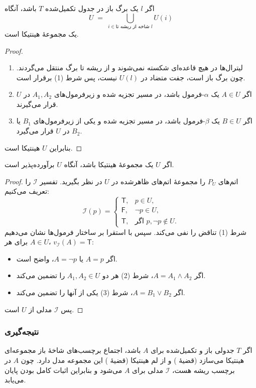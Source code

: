   \begin{theorem}[قضیهٔ \lr{2.77}]
  اگر \(l\) یک برگ باز در جدول تکمیل‌شده \(T\) باشد، آنگاه
  \[
    U \;=\;\bigcup_{i\in\text{شاخه از ریشه تا }l} U(i)
  \]
  یک مجموعهٔ هینتیکا است.
  \end{theorem}
  \begin{proof}
  \begin{enumerate}[1)]
    \item لیترال‌ها در هیچ قاعده‌ای شکسته نمی‌شوند و از ریشه تا برگ منتقل می‌گردند. چون برگ باز است، جفت متضاد در \(U(l)\) نیست، پس شرط (1) برقرار است.
    \item اگر \(A\in U\) یک \(\alpha\)-فرمول باشد، در مسیر تجزیه شده و زیرفرمول‌های \(A_1,A_2\) در \(U\) قرار می‌گیرند.
    \item اگر \(B\in U\) یک \(\beta\)-فرمول باشد، در مسیر تجزیه شده و یکی از زیرفرمول‌های \(B_1\) یا \(B_2\) در \(U\) قرار می‌گیرد.
  \end{enumerate}
  بنابراین \(U\) هینتیکا است.
  \end{proof}
  
  \begin{theorem}[لم هینتیکا \lr{2.78}]
  اگر \(U\) یک مجموعهٔ هینتیکا باشد، آنگاه \(U\) برآورده‌پذیر است.
  \end{theorem}
  \begin{proof}
  اتم‌های \(P_U\) را مجموعهٔ اتم‌های ظاهرشده در \(U\) در نظر بگیرید. تفسیر
  \(\mathscr{I}\) را تعریف می‌کنیم:
  \[
  \mathscr{I}(p)=
  \begin{cases}
  \mathsf{T}, & p\in U,\\
  \mathsf{F}, & \neg p\in U,\\
  \mathsf{T}, & \text{اگر }p,\neg p\notin U.
  \end{cases}
  \]
  شرط (1) تناقض را نفی می‌کند. سپس با استقرا بر ساختار فرمول‌ها نشان می‌دهیم برای هر \(A\in U\)، \(v_{\mathscr{I}}(A)=\mathsf{T}\):
  \begin{itemize}
    \item اگر \(A=p\) یا \(A=\neg p\)، واضح است.
    \item اگر \(A=A_1\land A_2\)، شرط (2) هر دو \(A_1,A_2\in U\) را تضمین می‌کند.
    \item اگر \(A=B_1\lor B_2\)، شرط (3) یکی از آنها را تضمین می‌کند.
  \end{itemize}
  پس \(\mathscr{I}\) مدلی از \(U\) است.
  \end{proof}
  
  \subsubsection*{نتیجه‌گیری}
  اگر \(T\) جدولی باز و تکمیل‌شده برای \(A\) باشد، اجتماع برچسب‌های شاخهٔ باز مجموعه‌ای هینتیکا می‌سازد (قضیهٔ ) و از لم هینتیکا (قضیهٔ ) این مجموعه مدل دارد. چون \(A\) در برچسب ریشه هست، \(\mathscr{I}\) مدلی برای \(A\) می‌شود و بنابراین اثبات کامل بودن پایان می‌یابد.